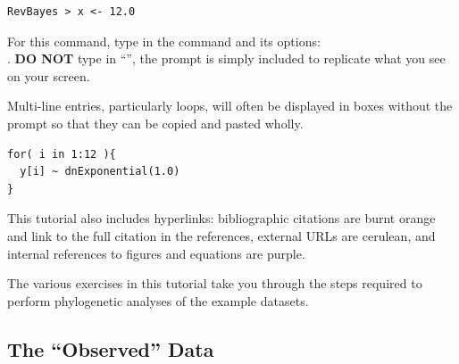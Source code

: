 {\tt \begin{snugshade*}
\begin{lstlisting}
RevBayes > x <- 12.0
\end{lstlisting}
\end{snugshade*}}

For this command, type in the command and its options:\\ . \textbf{DO NOT} type in ``'', the prompt is simply included to replicate what you see on your screen. 

Multi-line entries, particularly loops, will often be displayed in boxes without the  prompt so that they can be copied and pasted wholly. 
{\tt \begin{snugshade*}
\begin{lstlisting}
for( i in 1:12 ){
  y[i] ~ dnExponential(1.0)
}
\end{lstlisting}
\end{snugshade*}}


%


This tutorial also includes hyperlinks: bibliographic citations are {\textcolor{citescol}{burnt orange}} and link to the full citation in the references, external URLs are {\textcolor{urlscol}{cerulean}}, and internal references to figures and equations are {\textcolor{linkscol}{purple}}.

The various exercises in this tutorial take you through the steps required to perform phylogenetic analyses of the example datasets. 


\subsection{The ``Observed'' Data}

